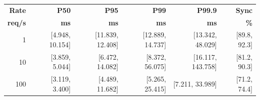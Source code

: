 \begin{tabular}{@{}rrrrrr@{}}
\toprule
\textbf{Rate} & \textbf{P50} & \textbf{P95} & \textbf{P99} & \textbf{P99.9} & \textbf{Sync} \\
\textbf{req/s} & \textbf{ms} & \textbf{ms} & \textbf{ms} & \textbf{ms} & \textbf{\%} \\
\midrule
1 & [4.948, 10.154] & [11.839, 12.408] & [12.889, 14.737] & [13.342, 48.029] & [89.8, 92.3] \\
10 & [3.859, 5.044] & [6.472, 14.082] & [8.372, 56.075] & [16.117, 143.758] & [81.2, 90.3] \\
100 & [3.119, 3.400] & [4.489, 11.682] & [5.265, 25.415] & [7.211, 33.989] & [71.2, 74.4] \\
\bottomrule
\end{tabular}
